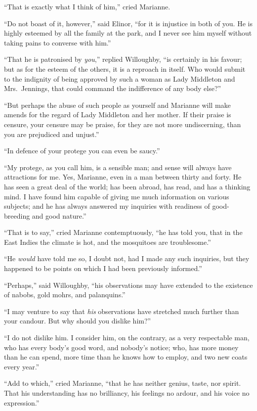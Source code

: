 ``That is exactly what I think of him,'' cried Marianne.

``Do not boast of it, however,'' said Elinor, ``for it
is injustice in both of you.  He is highly esteemed
by all the family at the park, and I never see him myself
without taking pains to converse with him.''

``That he is patronised by \emph{you},'' replied Willoughby,
``is certainly in his favour; but as for the esteem
of the others, it is a reproach in itself.  Who would
submit to the indignity of being approved by such a woman
as Lady Middleton and Mrs.\ Jennings, that could command
the indifference of any body else?''

``But perhaps the abuse of such people as yourself
and Marianne will make amends for the regard of Lady
Middleton and her mother.  If their praise is censure,
your censure may be praise, for they are not more undiscerning,
than you are prejudiced and unjust.''

``In defence of your protege you can even be saucy.''

``My protege, as you call him, is a sensible man;
and sense will always have attractions for me.
Yes, Marianne, even in a man between thirty and forty.
He has seen a great deal of the world; has been abroad,
has read, and has a thinking mind.  I have found him
capable of giving me much information on various subjects;
and he has always answered my inquiries with readiness of
good-breeding and good nature.''

``That is to say,'' cried Marianne contemptuously,
``he has told you, that in the East Indies the climate is hot,
and the mosquitoes are troublesome.''

``He \emph{would} have told me so, I doubt not, had I made
any such inquiries, but they happened to be points
on which I had been previously informed.''

``Perhaps,'' said Willoughby, ``his observations may
have extended to the existence of nabobs, gold mohrs,
and palanquins.''

``I may venture to say that \emph{his} observations
have stretched much further than your candour.
But why should you dislike him?''

``I do not dislike him.  I consider him, on the contrary,
as a very respectable man, who has every body's good word,
and nobody's notice; who, has more money than he can spend,
more time than he knows how to employ, and two new coats
every year.''

``Add to which,'' cried Marianne, ``that he has
neither genius, taste, nor spirit.  That his understanding
has no brilliancy, his feelings no ardour, and his voice
no expression.''


